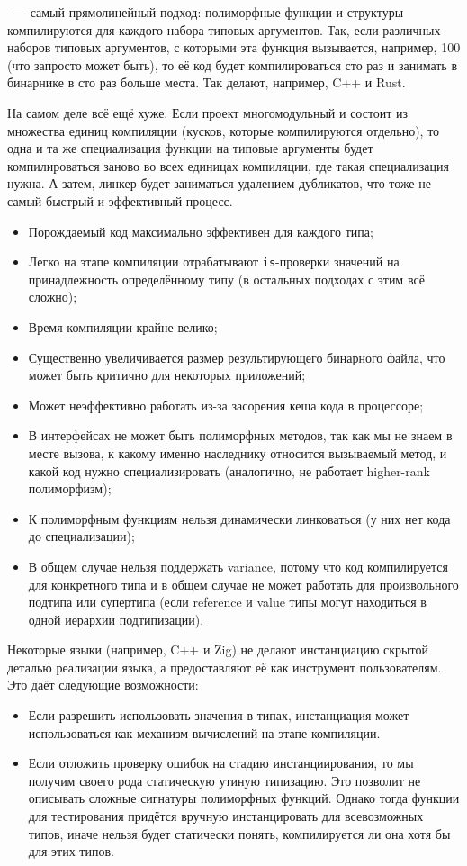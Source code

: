 ~--- самый прямолинейный подход: полиморфные функции и структуры компилируются для каждого набора типовых аргументов.
Так, если различных наборов типовых аргументов, с которыми эта функция вызывается, например, 100 (что запросто может быть), то её код будет компилироваться сто раз и занимать в бинарнике в сто раз больше места.
Так делают, например, C++ и Rust.

На самом деле всё ещё хуже.
Если проект многомодульный и состоит из множества единиц компиляции (кусков, которые компилируются отдельно), то одна и та же специализация функции на типовые аргументы будет компилироваться заново во всех единицах компиляции, где такая специализация нужна.
А затем, линкер будет заниматься удалением дубликатов, что тоже не самый быстрый и эффективный процесс.

\begin{itemize}
    \item[\positive] Порождаемый код максимально эффективен для каждого типа;
    \item[\positive] Легко на этапе компиляции отрабатывают \texttt{is}-проверки значений на принадлежность определённому типу (в остальных подходах с этим всё сложно);
    \item[\negative] Время компиляции крайне велико;
    \item[\negative] Существенно увеличивается размер результирующего бинарного файла, что может быть критично для некоторых приложений;
    \item[\negative] Может неэффективно работать из-за засорения кеша кода в процессоре;
    \item[\negative] В интерфейсах не может быть полиморфных методов, так как мы не знаем в месте вызова, к какому именно наследнику относится вызываемый метод, и какой код нужно специализировать (аналогично, не работает higher-rank полиморфизм);
    \item[\negative] К полиморфным функциям нельзя динамически линковаться (у них нет кода до специализации);
    \item[\negative] В общем случае нельзя поддержать variance, потому что код компилируется для конкретного типа и в общем случае не может работать для произвольного подтипа или супертипа (если reference и value типы могут находиться в одной иерархии подтипизации).
\end{itemize}

Некоторые языки (например, C++ и Zig) не делают инстанциацию скрытой деталью реализации языка, а предоставляют её как инструмент пользователям.
Это даёт следующие возможности:
\begin{itemize}
    \item Если разрешить использовать значения в типах, инстанциация может использоваться как механизм вычислений на этапе компиляции.
    \item Если отложить проверку ошибок на стадию инстанциирования, то мы получим своего рода статическую утиную типизацию.
    Это позволит не описывать сложные сигнатуры полиморфных функций.
    Однако тогда функции для тестирования придётся вручную инстанцировать для всевозможных типов, иначе нельзя будет статически понять, компилируется ли она хотя бы для этих типов.
\end{itemize}

